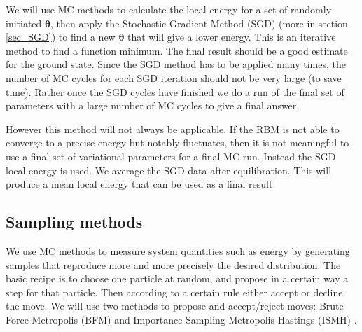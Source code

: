 
We will use MC methods to calculate the local energy for a set of randomly initiated $\boldsymbol{\theta}$, then apply the Stochastic Gradient Method (SGD) (more in section \ref{sec_SGD}) to find a new $\boldsymbol{\theta}$ that will give a lower energy. This is an iterative method to find a function minimum. The final result should be a good estimate for the ground state. Since the SGD method has to be applied many times, the number of MC cycles for each SGD iteration should not be very large (to save time). Rather once the SGD cycles have finished we do a run of the final set of parameters with a large number of MC cycles to give a final answer.

However this method will not always be applicable. If the RBM is not able to converge to a precise energy but notably fluctuates, then it is not meaningful to use a final set of variational parameters for a final MC run. Instead the SGD local energy is used. We average the SGD data after equilibration. This will produce a mean local energy that can be used as a final result.

\subsection{Sampling methods}
We use MC methods to measure system quantities such as energy by generating samples that reproduce more and more precisely the desired distribution. The basic recipe is to choose one particle at random, and propose in a certain way a step for that particle. Then according to a certain rule either accept or decline the move. We will use two methods to propose and accept/reject moves: Brute-Force Metropolis (BFM) and Importance Sampling Metropolis-Hastings (ISMH) \cite{morten_book}. 

